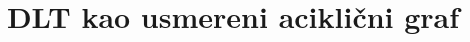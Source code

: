 \documentclass{article}
\title{DLT kao usmereni aciklični graf}
\begin{document}
\maketitle

\newpage
\tableofcontents








\begingroup
\raggedright
\endgroup
\end{document}
